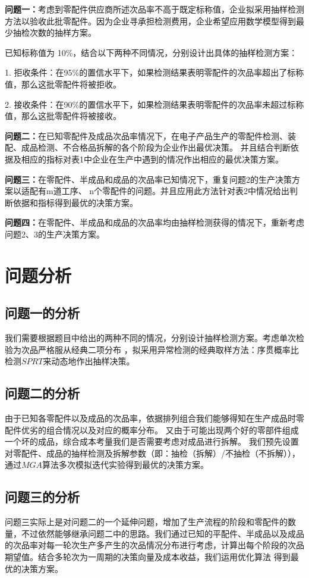 \documentclass[withoutpreface,bwprint]{cumcmthesis} %
\begin{document}
\textbf{问题一：}考虑到零配件供应商所述次品率不高于既定标称值，企业拟采用抽样检测方法以验收此批零配件。因为企业寻承担检测费用，企业希望应用数学模型得到最少抽检次数的抽样方案。

已知标称值为 10\%，结合以下两种不同情况，分别设计出具体的抽样检测方案：

1. 拒收条件：在95\%的置信水平下，如果检测结果表明零配件的次品率超出了标称值，那么这批零配件将被拒收。

2. 接收条件：在90\%的置信水平下，如果检测结果表明零配件的次品率未超过标称值，那么这批零配件将被接收。

\textbf{问题二：}在已知零配件及成品次品率情况下，在电子产品生产的零配件检测、装配、成品检测、不合格品拆解的各个阶段为企业作出最优决策。
并且结合判断依据及相应的指标对表1中企业在生产中遇到的情况作出相应的最优决策方案。

\textbf{问题三：}在零配件、半成品和成品的次品率已知情况下，重复问题2的生产决策方案以适配有m道工序、
n个零配件的问题。并且应用此方法针对表2中情况给出判断依据和指标得到最优的决策方案。

\textbf{问题四：}在零配件、半成品和成品的次品率均由抽样检测获得的情况下，重新考虑问题2、3的生产决策方案。
\section{问题分析}
\subsection{问题一的分析}
我们需要根据题目中给出的两种不同的情况，分别设计抽样检测方案。考虑单次检验为次品严格服从经典二项分布
，拟采用异常检测的经典取样方法：序贯概率比检测$SPRT$来动态地作出抽样决策。

\subsection{问题二的分析}
由于已知各零配件以及成品的次品率，依据排列组合我们能够得知在生产成品时零配件优劣的组合情况以及对应的概率分布。
又由于可能出现两个好的零部件组成一个坏的成品，综合成本考量我们是否需要考虑对成品进行拆解。
我们预先设置对零配件、成品的抽样检测及拆解参数（即：抽检（拆解）/不抽检（不拆解）），通过$MGA$算法多次模拟迭代实验得到最优的决策方案。
\subsection{问题三的分析}
问题三实际上是对问题二的一个延伸问题，增加了生产流程的阶段和零配件的数量，不过依然能够继承问题二中的思路。我们通过已知的平配件、半成品以及成品
的次品率对每一轮次生产多产生的次品情况分布进行考虑，计算出每个阶段的次品期望值。结合多轮次为一周期的决策向量及成本收益，我们运用优化算法
得到最优的决策方案。
\end{document}
